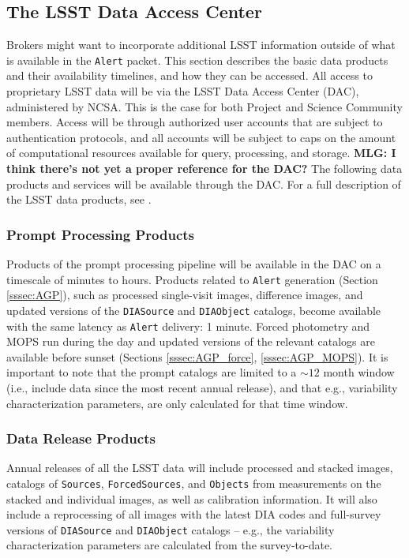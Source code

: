 \subsection{The LSST Data Access Center}

Brokers might want to incorporate additional LSST information outside of what is available in the {\tt Alert} packet.
This section describes the basic data products and their availability timelines, and how they can be accessed.
All access to proprietary LSST data will be via the LSST Data Access Center (DAC), administered by NCSA.
This is the case for both Project and Science Community members.
Access will be through authorized user accounts that are subject to authentication protocols, and all accounts will be subject to caps on the amount of computational resources available for query, processing, and storage.
{\bf MLG: I think there's not yet a proper reference for the DAC?} The following data products and services will be available through the DAC.
For a full description of the LSST data products, see .

\subsubsection{Prompt Processing Products}

Products of the prompt processing pipeline will be available in the DAC on a timescale of minutes to hours.
Products related to {\tt Alert} generation (Section \ref{sssec:AGP}), such as processed single-visit images, difference images, and updated versions of the {\tt DIASource} and {\tt DIAObject} catalogs, become available with the same latency as {\tt Alert} delivery: 1 minute.
Forced photometry and MOPS run during the day and updated versions of the relevant catalogs are available before sunset (Sections \ref{sssec:AGP_force}, \ref{sssec:AGP_MOPS}).
It is important to note that the prompt catalogs are limited to a $\sim12$ month window (i.e., include data since the most recent annual release), and that e.g., variability characterization parameters, are only calculated for that time window.

\subsubsection{Data Release Products}

Annual releases of all the LSST data will include processed and stacked images, catalogs of {\tt Sources}, {\tt ForcedSources}, and {\tt Objects} from measurements on the stacked and individual images, as well as calibration information.
It will also include a  reprocessing of all images with the latest DIA codes and full-survey versions of {\tt DIASource} and {\tt DIAObject} catalogs -- e.g., the variability characterization parameters are calculated from the survey-to-date.

